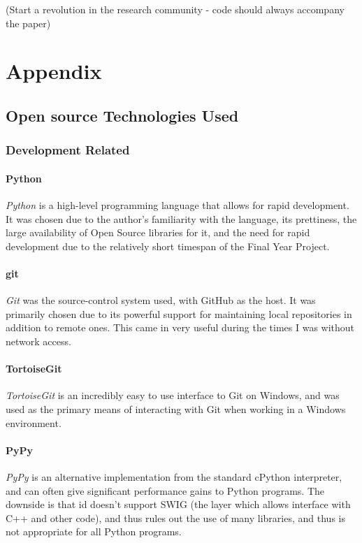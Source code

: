 \documentclass[a4paper,11pt]{report}
\begin{document}
(Start a revolution in the research community - code should always accompany the paper)

\chapter{Appendix}
\section{Open source Technologies Used}

\subsection{Development Related}

\subsubsection*{Python}
\emph{Python}\cite{prog:python} is a high-level programming language that allows for rapid development. It was chosen due to the author's familiarity with the language, its prettiness, the large availability of Open Source libraries for it, and the need for rapid development due to the relatively short timespan of the Final Year Project.

\subsubsection*{git}
\emph{Git}\cite{prog:git} was the source-control system used, with GitHub as the host. It was primarily chosen due to its powerful support for maintaining local repositories in addition to remote ones. This came in very useful during the times I was without network access.

\subsubsection*{TortoiseGit}
\emph{TortoiseGit}\cite{prog:tortoisegit} is an incredibly easy to use interface to Git on Windows, and was used as the primary means of interacting with Git when working in a Windows environment.

\subsubsection*{PyPy}
\emph{PyPy}\cite{prog:pypy} is an alternative implementation from the standard cPython interpreter, and can often give significant performance gains to Python programs. The downside is that id doesn't support SWIG (the layer which allows interface with C++ and other code), and thus rules out the use of many libraries, and thus is not appropriate for all Python programs.
\end{document}
